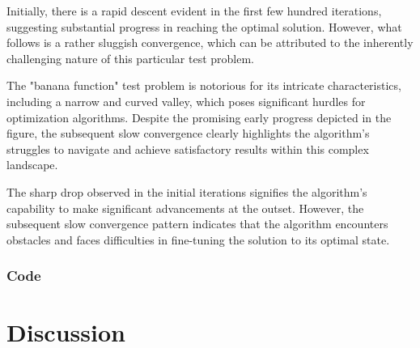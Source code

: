 \documentclass[12pt, a4paper]{article}
\numberwithin{equation}{section}
\begin{document}
Initially, there is a rapid descent evident in the first few hundred iterations, suggesting substantial progress in reaching the optimal solution. However, what follows is a rather sluggish convergence, which can be attributed to the inherently challenging nature of this particular test problem.

The "banana function" test problem is notorious for its intricate characteristics, including a narrow and curved valley, which poses significant hurdles for optimization algorithms. Despite the promising early progress depicted in the figure, the subsequent slow convergence clearly highlights the algorithm's struggles to navigate and achieve satisfactory results within this complex landscape.

The sharp drop observed in the initial iterations signifies the algorithm's capability to make significant advancements at the outset. However, the subsequent slow convergence pattern indicates that the algorithm encounters obstacles and faces difficulties in fine-tuning the solution to its optimal state.


\newpage
\subsubsection{Code}


\newpage
\section{Discussion}
\end{document}
